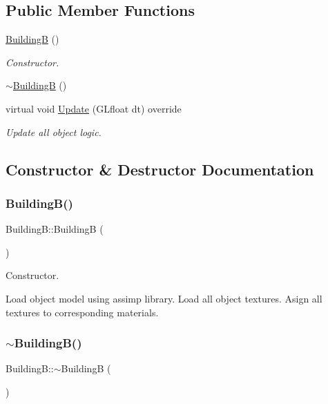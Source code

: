 \subsection*{Public Member Functions}
\begin{DoxyCompactItemize}
\item 
\mbox{\hyperlink{class_building_b_a3aa3139cd5ad6841fd7dbeda2cab94d2}{BuildingB}} ()
\begin{DoxyCompactList}\small\item\em Constructor. \end{DoxyCompactList}\item 
\mbox{\hyperlink{class_building_b_a128dcf4db78a81c5a2997ed6b216d23a}{$\sim$\+BuildingB}} ()
\item 
virtual void \mbox{\hyperlink{class_building_b_af1099c2ece82f5c5ec3a7ce7a9edc752}{Update}} (G\+Lfloat dt) override
\begin{DoxyCompactList}\small\item\em Update all object logic. \end{DoxyCompactList}\end{DoxyCompactItemize}


\subsection{Constructor \& Destructor Documentation}
\mbox{\label{class_building_b_a3aa3139cd5ad6841fd7dbeda2cab94d2}} 
\subsubsection{\texorpdfstring{BuildingB()}{BuildingB()}}
{\footnotesize\ttfamily Building\+B\+::\+BuildingB (\begin{DoxyParamCaption}{ }\end{DoxyParamCaption})}



Constructor. 

Load object model using assimp library. Load all object textures. Asign all textures to corresponding materials. \mbox{\label{class_building_b_a128dcf4db78a81c5a2997ed6b216d23a}} 
\subsubsection{\texorpdfstring{$\sim$BuildingB()}{~BuildingB()}}
{\footnotesize\ttfamily Building\+B\+::$\sim$\+BuildingB (\begin{DoxyParamCaption}{ }\end{DoxyParamCaption})}



